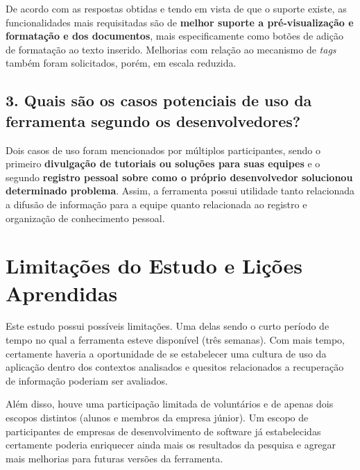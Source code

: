 De acordo com as respostas obtidas e tendo em vista de que o suporte existe, as funcionalidades mais requisitadas são de \textbf{melhor suporte a pré-visualização e formatação e dos documentos}, mais especificamente como botões de adição de formatação ao texto inserido. Melhorias com relação ao mecanismo de \textit{tags} também foram solicitados, porém, em escala reduzida.

\subsection{3. Quais são os casos potenciais de uso da ferramenta segundo os desenvolvedores?}

Dois casos de uso foram mencionados por múltiplos participantes, sendo o primeiro \textbf{divulgação de tutoriais ou soluções para suas equipes} e o segundo \textbf{registro pessoal sobre como o próprio desenvolvedor solucionou determinado problema}. Assim, a ferramenta possui utilidade tanto relacionada a difusão de informação para a equipe quanto relacionada ao registro e organização de conhecimento pessoal.

\section{Limitações do Estudo e Lições Aprendidas}

Este estudo possui possíveis limitações. Uma delas sendo o curto período de tempo no qual a ferramenta esteve disponível (três semanas). Com mais tempo, certamente haveria a oportunidade de se estabelecer uma cultura de uso da aplicação dentro dos contextos analisados e quesitos relacionados a recuperação de informação poderiam ser avaliados.

Além disso, houve uma participação limitada de voluntários e de apenas dois escopos distintos (alunos e membros da empresa júnior). Um escopo de participantes de empresas de desenvolvimento de software já estabelecidas certamente poderia enriquecer ainda mais os resultados da pesquisa e agregar mais melhorias para futuras versões da ferramenta.

